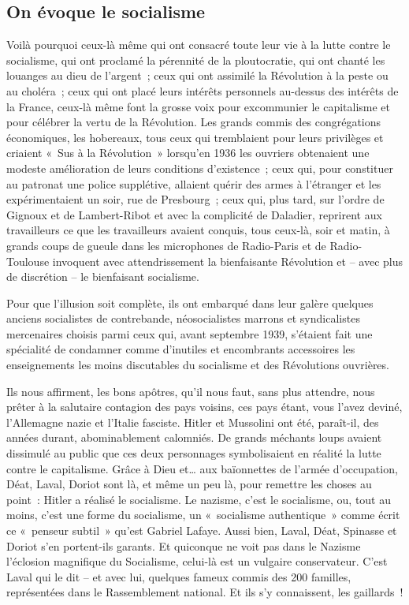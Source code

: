 \documentclass[french,twoside]{book} %
\begin{document}
\subsection[On évoque le socialisme]{On évoque le socialisme}
\noindent Voilà pourquoi ceux-là même qui ont consacré toute leur vie à la lutte contre le socialisme, qui ont proclamé la pérennité de la ploutocratie, qui ont chanté les louanges au dieu de l’argent ; ceux qui ont assimilé la Révolution à la peste ou au choléra ; ceux qui ont placé leurs intérêts personnels au-dessus des intérêts de la France, ceux-là même font la grosse voix pour excommunier le capitalisme et pour célébrer la vertu de la Révolution. Les grands commis des congrégations économiques, les hobereaux, tous ceux qui tremblaient pour leurs privilèges et criaient « Sus à la Révolution » lorsqu’en 1936 les ouvriers obtenaient une modeste amélioration de leurs conditions d’existence ; ceux qui, pour constituer au patronat une police supplétive, allaient quérir des armes à l’étranger et les expérimentaient un soir, rue de Presbourg ; ceux qui, plus tard, sur l’ordre de Gignoux et de Lambert-Ribot et avec la complicité de Daladier, reprirent aux travailleurs ce que les travailleurs avaient conquis, tous ceux-là, soir et matin, à grands coups de gueule dans les microphones de Radio-Paris et de Radio-Toulouse invoquent avec attendrissement la bienfaisante Révolution et – avec plus de discrétion – le bienfaisant socialisme.\par
Pour que l’illusion soit complète, ils ont embarqué dans leur galère quelques anciens socialistes de contrebande, néosocialistes marrons et syndicalistes mercenaires choisis parmi ceux qui, avant septembre 1939, s’étaient fait une spécialité de condamner comme d’inutiles et encombrants accessoires les enseignements les moins discutables du socialisme et des Révolutions ouvrières.\par
Ils nous affirment, les bons apôtres, qu’il nous faut, sans plus attendre, nous prêter à la salutaire contagion des pays voisins, ces pays étant, vous l’avez deviné, l’Allemagne nazie et l’Italie fasciste. Hitler et Mussolini ont été, paraît-il, des années durant, abominablement calomniés. De grands méchants loups avaient dissimulé au public que ces deux personnages symbolisaient en réalité la lutte contre le capitalisme. Grâce à Dieu et… aux baïonnettes de l’armée d’occupation, Déat, Laval, Doriot sont là, et même un peu là, pour remettre les choses au point : Hitler a réalisé le socialisme. Le nazisme, c’est le socialisme, ou, tout au moins, c’est une forme du socialisme, un « socialisme authentique » comme écrit ce « penseur subtil » qu’est Gabriel Lafaye. Aussi bien, Laval, Déat, Spinasse et Doriot s’en portent-ils garants. Et quiconque ne voit pas dans le Nazisme l’éclosion magnifique du Socialisme, celui-là est un vulgaire conservateur. C’est Laval qui le dit – et avec lui, quelques fameux commis des 200 familles, représentées dans le Rassemblement national. Et ils s’y connaissent, les gaillards !
\end{document}
